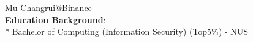 \documentclass[a0,portrait]{a0poster}
\begin{document}
\begin{minipage}[b][][t]{.6\linewidth}
\vfill
\makeatletter
\raggedright{\fontsize{92pt}{100pt}\selectfont\color{binanceyellow}\textbf{{\@title}}\par}
\makeatother
\color{Black}
\vspace{1cm}
\LARGE\underline{Mu Changrui}@Binance\\
\vspace{0.2cm}
\large \textbf{Education Background}:\\
\large
* Bachelor of Computing (Information Security) (Top5\%)      - NUS
\end{minipage}%
%
\begin{minipage}[b][][t]{0.39\linewidth}
\vfill
\end{minipage}
\vspace{0cm}

\end{document}
